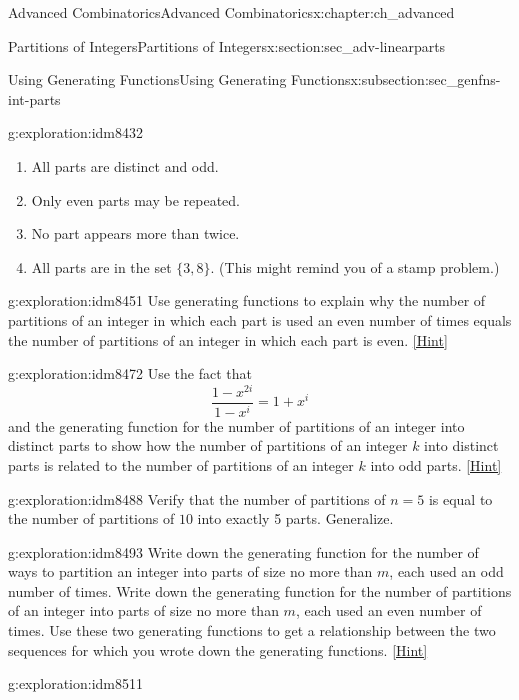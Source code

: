 \documentclass[oneside,10pt,]{book}
\numberwithin{equation}{chapter}
\begin{document}
\begin{chapterptx}{Advanced Combinatorics}{}{Advanced Combinatorics}{}{}{x:chapter:ch_advanced}
\begin{sectionptx}{Partitions of Integers}{}{Partitions of Integers}{}{}{x:section:sec_adv-linearparts}
\begin{subsectionptx}{Using Generating Functions}{}{Using Generating Functions}{}{}{x:subsection:sec_genfns-int-parts}
\begin{exploration}{}{g:exploration:idm8432}
\begin{enumerate}[font=\bfseries,label=(\alph*),ref=\alph*]
\item{}All parts are distinct and odd.%
\item{}Only even parts may be repeated.%
\item{}No part appears more than twice.%
\item{}All parts are in the set \(\{3,8\}\).  (This might remind you of a stamp problem.)%
\end{enumerate}
\end{exploration}
\begin{exploration}{}{g:exploration:idm8451}%
Use generating functions to explain why the number of partitions of an integer in which each part is used an even number of times equals the number of partitions of an integer in which each part is even.%
\space\hspace*{0pt}\hfill{\tiny\hyperlink{g:hint:idm8454-back}{[Hint]}}\end{exploration}
\begin{exploration}{}{g:exploration:idm8472}%
Use the fact that%
\begin{equation*}
\frac{1-x^{2i}}{1-x^i}= 1+x^i
\end{equation*}
and the generating function for the number of partitions of an integer into distinct parts to show how the number of partitions of an integer \(k\) into distinct parts is related to the number of partitions of an integer \(k\) into odd parts.%
\space\hspace*{0pt}\hfill{\tiny\hyperlink{g:hint:idm8478-back}{[Hint]}}\end{exploration}
\begin{exploration}{}{g:exploration:idm8488}%
Verify that the number of partitions of \(n=5\) is equal to the number of partitions of \(10\) into exactly 5 parts.  Generalize.%
\end{exploration}
\begin{exploration}{}{g:exploration:idm8493}%
Write down the generating function for the number of ways to partition an integer into parts of size no more than \(m\), each used an odd number of times. Write down the generating function for the number of partitions of an integer into parts of size no more than \(m\), each used an even number of times. Use these two generating functions to get a relationship between the two sequences for which you wrote down the generating functions.%
\space\hspace*{0pt}\hfill{\tiny\hyperlink{g:hint:idm8498-back}{[Hint]}}\end{exploration}
\begin{exploration}{}{g:exploration:idm8511}%

\end{exploration}
\end{subsectionptx}
\end{sectionptx}
\end{chapterptx}
\end{document}
